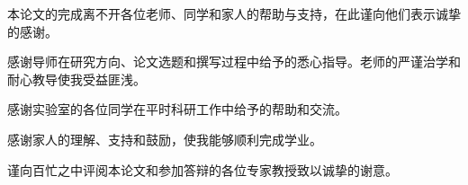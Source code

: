 \acknowledgment

本论文的完成离不开各位老师、同学和家人的帮助与支持，在此谨向他们表示诚挚的感谢。

感谢导师在研究方向、论文选题和撰写过程中给予的悉心指导。老师的严谨治学和耐心教导使我受益匪浅。

感谢实验室的各位同学在平时科研工作中给予的帮助和交流。

感谢家人的理解、支持和鼓励，使我能够顺利完成学业。

谨向百忙之中评阅本论文和参加答辩的各位专家教授致以诚挚的谢意。
